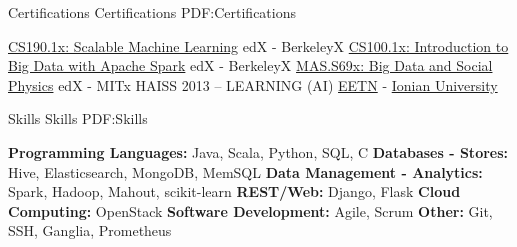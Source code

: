 \documentclass[letterpaper,MMMyyyy,nonstopmode]{simpleresumecv}
\begin{document}
\begin{Body}

\Section
{Certifications}
{Certifications}
{PDF:Certifications}

\Entry
\BulletItem
\href{https://s3.amazonaws.com/verify.edx.org/downloads/1a3787ec554649b3be0738d8f9c4f7cd/Certificate.pdf}{CS190.1x: Scalable Machine Learning}
\hfill edX - BerkeleyX
\BulletItem
\href{https://s3.amazonaws.com/verify.edx.org/downloads/ce3ef276c0d14f47b3a74bb1dc16b3ef/Certificate.pdf}{CS100.1x: Introduction to Big Data with Apache Spark}
\hfill edX - BerkeleyX
\BulletItem
\href{https://s3.amazonaws.com/verify.edx.org/downloads/22da36d4c36c4ffeac2c3bfb72481b2d/Certificate.pdf}{MAS.S69x: Big Data and Social Physics}
\hfill edX - MITx
\BulletItem
HAISS 2013 – LEARNING (AI)
\hfill 
\href{http://www.eetn.gr/}{EETN} - 
\href{http://www.ionio.gr/}{Ionian University}


\Section
{Skills}
{Skills}
{PDF:Skills}

\Entry
\BulletItem
\textbf{Programming Languages: }Java, Scala, Python, SQL, C
\BulletItem
\textbf{Databases - Stores:} Hive, Elasticsearch, MongoDB, MemSQL
\BulletItem
\textbf{Data Management - Analytics:} Spark, Hadoop, Mahout, scikit-learn
\BulletItem
\textbf{REST/Web:} Django, Flask
\BulletItem
\textbf{Cloud Computing:} OpenStack
\BulletItem
\textbf{Software Development:} Agile, Scrum
\BulletItem
\textbf{Other:} Git, SSH, Ganglia, Prometheus





\end{Body}
\end{document}
